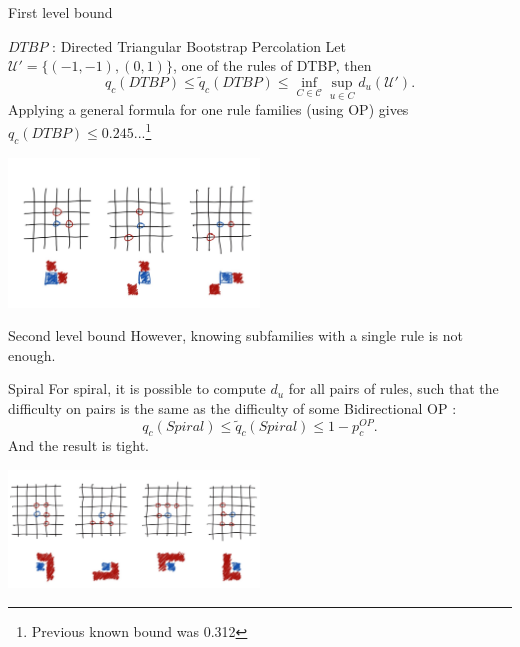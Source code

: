 \begin{frame}{First level bound}
	\begin{block}{$DTBP$ : Directed Triangular Bootstrap Percolation}
		Let $\mathcal{U}' = \{(-1, -1), (0,1)\}$, one of the rules of DTBP, then
		\begin{equation*}
			q_c(DTBP) \leq \tilde q_c(DTBP) \leq \inf_{C\in\mathcal{C}} \sup_{u\in C} d_u(\mathcal{U}').
		\end{equation*}
		Applying a general formula for one rule families (using OP) gives $q_c(DTBP) \leq 0.245...$\footnote{Previous known bound was 0.312}
	\end{block}
	\begin{center}
    	 	\includegraphics[width=0.5\textwidth]{dtbp.jpg}
	\end{center}
\end{frame}

\begin{frame}{Second level bound}
	However, knowing subfamilies with a single rule is not enough.
	\begin{block}{Spiral}
		For spiral, it is possible to compute $d_u$ for all pairs of rules, such that the difficulty on pairs is the same as the difficulty of some Bidirectional OP :
		\begin{equation*}
			q_c(Spiral) \leq \tilde q_c(Spiral) \leq 1 - p_c^{OP}.
		\end{equation*}
		And the result is tight.
	\end{block}
	\begin{center}
    	 	\includegraphics[width=0.5\textwidth]{spiral.jpg}
	\end{center}
\end{frame}
